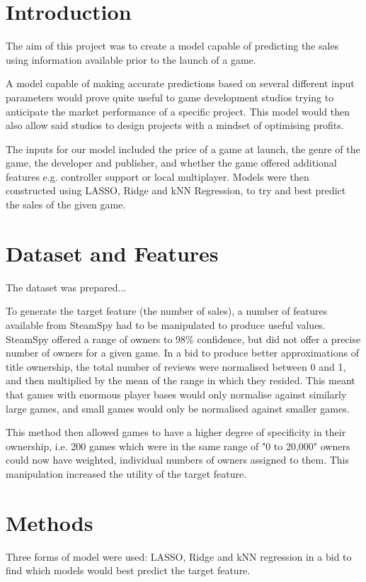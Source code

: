 \section{Introduction}
The aim of this project was to create a model capable of predicting the sales using information available prior to the launch of a game.

A model capable of making accurate predictions based on several different input parameters would prove quite useful to game development studios trying to anticipate the market performance of a specific project. This model would then also allow said studios to design projects with a mindset of optimising profits. 

The inputs for our model included the price of a game at launch, the genre of the game, the developer and publisher, and whether the game offered additional features e.g. controller support or local multiplayer. Models were then constructed using LASSO, Ridge and kNN Regression, to try and best predict the sales of the given game.

\section{Dataset and Features}
The dataset was prepared...

To generate the target feature (the number of sales), a number of features available from SteamSpy had to be manipulated to produce useful values. SteamSpy offered a range of owners to 98\% confidence, but did not offer a precise number of owners for a given game. In a bid to produce better approximations of title ownership, the total number of reviews were normalised between 0 and 1, and then multiplied by the mean of the range in which they resided.
This meant that games with enormous player bases would only normalise against similarly large games, and small games would only be normalised against smaller games.
 
This method then allowed games to have a higher degree of specificity in their ownership, i.e. 200 games which were in the same range of "0 to 20,000" owners could now have weighted, individual numbers of owners assigned to them. This manipulation increased the utility of the target feature.

\section{Methods}
Three forms of model were used: LASSO, Ridge and kNN regression in a bid to find which models would best predict the target feature.

